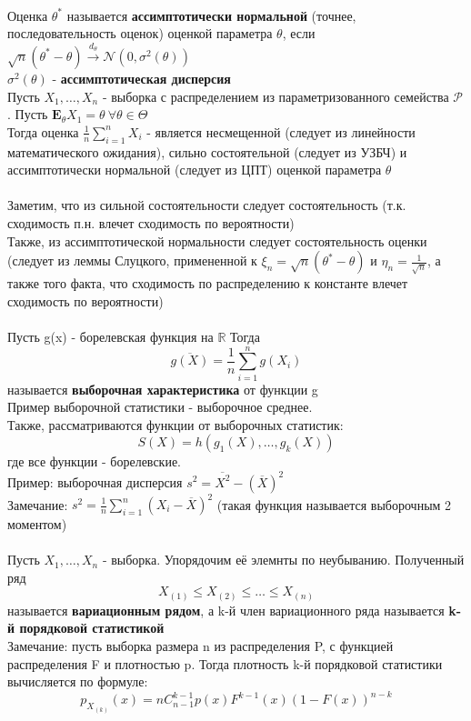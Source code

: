 \documentclass[25pt]{article}
\begin{document}
\\
Оценка $\theta^*$ называется \textbf{ассимптотически нормальной} (точнее, последовательность оценок) оценкой параметра $\theta$, если
\\ $\sqrt{n}(\theta^* - \theta) \xrightarrow{d_\theta} \mathcal{N}(0, \sigma^2(\theta))$
\\ $\sigma^2(\theta)$ - \textbf{ассимптотическая дисперсия}
\\
Пусть $X_1,\dots,X_n$ - выборка с распределением из параметризованного семейства $\mathcal{P}$. 
Пусть $\textbf{E}_\theta X_1 = \theta \ \forall \theta \in \Theta$
\\ Тогда оценка $\frac{1}{n}\sum_{i=1}^n X_i$ - является несмещенной (следует из линейности математического ожидания), сильно состоятельной (следует из УЗБЧ) и ассимптотически нормальной (следует из ЦПТ) оценкой параметра $\theta$
\\ \\
Заметим, что из сильной состоятельности следует состоятельность (т.к. сходимость п.н. влечет сходимость по вероятности)
\\ Также, из ассимптотической нормальности следует состоятельность оценки (следует из леммы Слуцкого, примененной к $\xi_n = \sqrt{n}(\theta^* - \theta)$ и $\eta_n = \frac{1}{\sqrt{n}}$, а также того факта, что сходимость по распределению к константе влечет сходимость по вероятности)
\\ \\
Пусть g(x) - борелевская функция на $\mathbb{R}$ Тогда 
$$ \overline{g(X)} = \frac{1}{n}\sum_{i=1}^n g(X_i)$$
называется \textbf{выборочная характеристика} от функции g
\\
Пример выборочной статистики - выборочное среднее.
\\
Также, рассматриваются функции от выборочных статистик:
$$S(X) = h(g_1(X),\dots,g_k(X))$$
где все функции - борелевские.
\\
Пример: выборочная дисперсия $s^2 = \overline{X^2} - (\overline{X})^2$
\\
Замечание: $s^2 = \frac{1}{n}\sum_{i=1}^n(X_i - \overline{X})^2$ (такая функция называется выборочным 2 моментом)
\\
\\
Пусть $X_1,\dots,X_n$ - выборка. Упорядочим её элемнты по неубыванию. Полученный ряд
$$ X_{(1)} \leq X_{(2)} \leq \dots \leq X_{(n)} $$
называется \textbf{вариационным рядом}, а k-й член вариационного ряда называется \textbf{k-й порядковой статистикой}
\\
Замечание: пусть выборка размера n из распределения P, с функцией распределения F и плотностью p. Тогда плотность k-й порядковой статистики вычисляется по формуле:
$$ p_{X_{(k)} }(x) = n C_{n-1}^{k-1}p(x)F^{k-1}(x)(1 -F(x))^{n-k}$$
\end{document}

